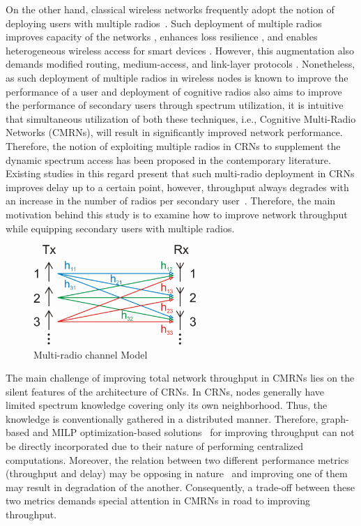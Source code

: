 On the other hand, classical wireless networks frequently adopt the notion of deploying users with multiple radios~\cite{bahl2004reconsidering, adya2004multi}. Such deployment of multiple radios improves capacity of the networks \cite{draves2004routing, bahl2004reconsidering}, enhances loss resilience \cite{miu2005improving}, and enables heterogeneous wireless access for smart devices \cite{song2012performance}. However, this augmentation also demands modified routing, medium-access, and link-layer protocols \cite{kyasanur2006routing, chatterjee2013low}. Nonetheless, as such deployment of multiple radios in wireless nodes is known to improve the performance of a user and  deployment of cognitive radios also aims to improve the performance of secondary users through spectrum utilization, it is intuitive that simultaneous utilization of both these techniques, i.e., Cognitive Multi-Radio Networks (CMRNs), will result in significantly improved network performance. Therefore, the notion of exploiting multiple radios in CRNs to supplement the dynamic spectrum access has been proposed in the contemporary literature. Existing studies in this regard present that such multi-radio deployment in CRNs improves delay up to a certain point, however, throughput always degrades with an increase in the number of radios per secondary user~\cite{khan2015towards}. Therefore, the main motivation behind this study is to examine how to improve network throughput while equipping secondary users with multiple radios.

\begin{figure}[!htbp]
    \begin{center}
        \includegraphics[width=0.55\textwidth]{myFigures/MIMO.png}
        \caption{Multi-radio channel Model~\cite{mimoWiki}}
        \label{fig:MIMO}
    \end{center}
\end{figure}

The main challenge of improving total network throughput in CMRNs lies on the silent features of the architecture of CRNs. In CRNs, nodes generally have limited spectrum knowledge covering only its own neighborhood. Thus, the knowledge is conventionally gathered in a distributed manner. Therefore, graph-based and MILP optimization-based solutions~\cite{hoang2008downlink,ahmed2014channel} for improving throughput can not be directly incorporated due to their nature of performing centralized computations. Moreover, the relation between two different performance metrics (throughput and delay) may be opposing in nature~\cite{gamal2004throughput} and improving one of them may result in degradation of the another. Consequently, a trade-off between these two metrics demands special attention in CMRNs in road to improving throughput.

